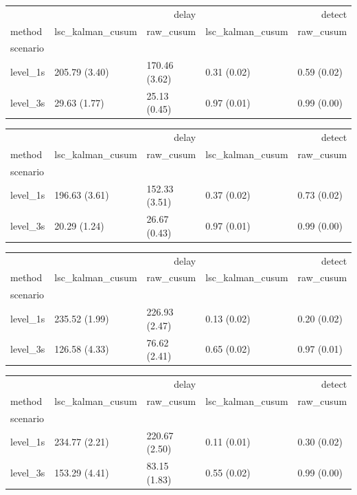 \begin{tabular}{lllll}
\toprule
 & \multicolumn{2}{r}{delay} & \multicolumn{2}{r}{detect} \\
method & lsc_kalman_cusum & raw_cusum & lsc_kalman_cusum & raw_cusum \\
scenario &  &  &  &  \\
\midrule
level_1s & 205.79 (3.40) & 170.46 (3.62) & 0.31 (0.02) & 0.59 (0.02) \\
level_3s & 29.63 (1.77) & 25.13 (0.45) & 0.97 (0.01) & 0.99 (0.00) \\
\bottomrule
\end{tabular}

\begin{tabular}{lllll}
\toprule
 & \multicolumn{2}{r}{delay} & \multicolumn{2}{r}{detect} \\
method & lsc_kalman_cusum & raw_cusum & lsc_kalman_cusum & raw_cusum \\
scenario &  &  &  &  \\
\midrule
level_1s & 196.63 (3.61) & 152.33 (3.51) & 0.37 (0.02) & 0.73 (0.02) \\
level_3s & 20.29 (1.24) & 26.67 (0.43) & 0.97 (0.01) & 0.99 (0.00) \\
\bottomrule
\end{tabular}

\begin{tabular}{lllll}
\toprule
 & \multicolumn{2}{r}{delay} & \multicolumn{2}{r}{detect} \\
method & lsc_kalman_cusum & raw_cusum & lsc_kalman_cusum & raw_cusum \\
scenario &  &  &  &  \\
\midrule
level_1s & 235.52 (1.99) & 226.93 (2.47) & 0.13 (0.02) & 0.20 (0.02) \\
level_3s & 126.58 (4.33) & 76.62 (2.41) & 0.65 (0.02) & 0.97 (0.01) \\
\bottomrule
\end{tabular}

\begin{tabular}{lllll}
\toprule
 & \multicolumn{2}{r}{delay} & \multicolumn{2}{r}{detect} \\
method & lsc_kalman_cusum & raw_cusum & lsc_kalman_cusum & raw_cusum \\
scenario &  &  &  &  \\
\midrule
level_1s & 234.77 (2.21) & 220.67 (2.50) & 0.11 (0.01) & 0.30 (0.02) \\
level_3s & 153.29 (4.41) & 83.15 (1.83) & 0.55 (0.02) & 0.99 (0.00) \\
\bottomrule
\end{tabular}

